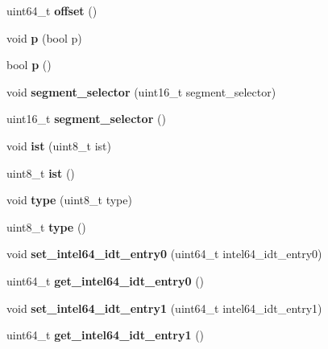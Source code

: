 \begin{DoxyCompactItemize}
\item 
\hypertarget{classintel64__idt__entry_afb87c81dc48ca3181df4e3cc02060582}{}\label{classintel64__idt__entry_afb87c81dc48ca3181df4e3cc02060582} 
uint64\+\_\+t {\bfseries offset} ()
\item 
\hypertarget{classintel64__idt__entry_a4ac5fe1536073c47a1f6250c8e3c76dc}{}\label{classintel64__idt__entry_a4ac5fe1536073c47a1f6250c8e3c76dc} 
void {\bfseries p} (bool p)
\item 
\hypertarget{classintel64__idt__entry_af1667a52578cedb9579e275dfa99e99b}{}\label{classintel64__idt__entry_af1667a52578cedb9579e275dfa99e99b} 
bool {\bfseries p} ()
\item 
\hypertarget{classintel64__idt__entry_ac0d1aa71414d543e8df0e2bdcfffe82e}{}\label{classintel64__idt__entry_ac0d1aa71414d543e8df0e2bdcfffe82e} 
void {\bfseries segment\+\_\+selector} (uint16\+\_\+t segment\+\_\+selector)
\item 
\hypertarget{classintel64__idt__entry_a979a444a42eae4301d1f777612061b96}{}\label{classintel64__idt__entry_a979a444a42eae4301d1f777612061b96} 
uint16\+\_\+t {\bfseries segment\+\_\+selector} ()
\item 
\hypertarget{classintel64__idt__entry_a56433b6db1cb3663419d655e47961eb9}{}\label{classintel64__idt__entry_a56433b6db1cb3663419d655e47961eb9} 
void {\bfseries ist} (uint8\+\_\+t ist)
\item 
\hypertarget{classintel64__idt__entry_a4325dfbf088793245d29110dd5ca7c34}{}\label{classintel64__idt__entry_a4325dfbf088793245d29110dd5ca7c34} 
uint8\+\_\+t {\bfseries ist} ()
\item 
\hypertarget{classintel64__idt__entry_afaf8e021378b23f17a2f15eebccef7f5}{}\label{classintel64__idt__entry_afaf8e021378b23f17a2f15eebccef7f5} 
void {\bfseries type} (uint8\+\_\+t type)
\item 
\hypertarget{classintel64__idt__entry_a03ddcf177598b2d47d499a3199fee9a8}{}\label{classintel64__idt__entry_a03ddcf177598b2d47d499a3199fee9a8} 
uint8\+\_\+t {\bfseries type} ()
\item 
\hypertarget{classintel64__idt__entry_ad8a58e31eb3fc61a76fa157d825c2483}{}\label{classintel64__idt__entry_ad8a58e31eb3fc61a76fa157d825c2483} 
void {\bfseries set\+\_\+intel64\+\_\+idt\+\_\+entry0} (uint64\+\_\+t intel64\+\_\+idt\+\_\+entry0)
\item 
\hypertarget{classintel64__idt__entry_abe93238c4630d4a5d55e9bd1333129eb}{}\label{classintel64__idt__entry_abe93238c4630d4a5d55e9bd1333129eb} 
uint64\+\_\+t {\bfseries get\+\_\+intel64\+\_\+idt\+\_\+entry0} ()
\item 
\hypertarget{classintel64__idt__entry_adebe9a174fc5722859ed508cd8e48beb}{}\label{classintel64__idt__entry_adebe9a174fc5722859ed508cd8e48beb} 
void {\bfseries set\+\_\+intel64\+\_\+idt\+\_\+entry1} (uint64\+\_\+t intel64\+\_\+idt\+\_\+entry1)
\item 
\hypertarget{classintel64__idt__entry_a8425e14356e2c24c047d0250cb8ac237}{}\label{classintel64__idt__entry_a8425e14356e2c24c047d0250cb8ac237} 
uint64\+\_\+t {\bfseries get\+\_\+intel64\+\_\+idt\+\_\+entry1} ()
\end{DoxyCompactItemize}


